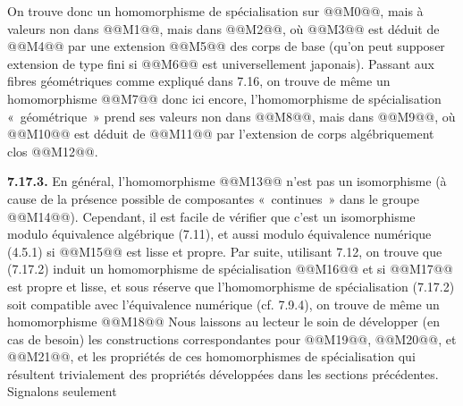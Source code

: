 
On
trouve donc un homomorphisme de spécialisation sur @@M0@@, mais à valeurs non dans @@M1@@, mais dans @@M2@@, où @@M3@@ est déduit de @@M4@@ par une extension @@M5@@ des corps de base (qu'on peut supposer extension de type fini si @@M6@@ est universellement japonais). Passant aux fibres géométriques comme expliqué dans 7.16, on trouve de même un homomorphisme
@@M7@@
donc ici encore, l'homomorphisme de spécialisation «~géométrique~» prend ses valeurs non dans @@M8@@, mais dans @@M9@@, où @@M10@@ est déduit de @@M11@@ par l'extension de corps algébriquement clos @@M12@@.

\textbf{7.17.3.} En général, l'homomorphisme @@M13@@ n'est pas un isomorphisme (à cause de la présence possible de composantes «~continues~» dans le groupe @@M14@@). Cependant, il est facile de vérifier que c'est un isomorphisme modulo équivalence algébrique (7.11), et aussi modulo équivalence numérique (4.5.1) si @@M15@@ est lisse et propre. Par suite, utilisant 7.12, on trouve que (7.17.2) induit un homomorphisme de spécialisation
@@M16@@
et si @@M17@@ est propre et lisse, et sous réserve que l'homomorphisme de spécialisation (7.17.2) soit compatible avec l'équivalence numérique (cf. 7.9.4), on trouve de même un homomorphisme
@@M18@@
Nous laissons au lecteur le soin de développer (en cas de besoin) les constructions correspondantes pour @@M19@@, @@M20@@, et @@M21@@, et les propriétés de ces homomorphismes de spécialisation qui résultent trivialement des propriétés développées dans les sections précédentes. Signalons seulement
